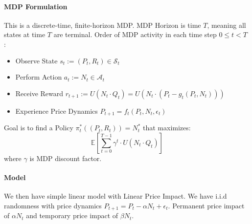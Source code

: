 \documentclass[11pt]{article}
\begin{document}
\paragraph*{MDP Formulation}
This is a discrete-time, finite-horizon MDP.
MDP Horizon is time $T$, meaning all states at time $T$ are terminal.
Order of MDP activity in each time step $0 \leq t<T$ :
\begin{itemize}
    \item Observe State $s_t:=\left(P_t, R_t\right) \in \mathcal{S}_t$
    \item Perform Action $a_t:=N_t \in \mathcal{A}_t$
    \item Receive Reward $r_{t+1}:=U\left(N_t \cdot Q_t\right)=U\left(N_t \cdot\left(P_t-g_t\left(P_t, N_t\right)\right)\right)$
    \item Experience Price Dynamics $P_{t+1}=f_t\left(P_t, N_t, \epsilon_t\right)$
\end{itemize}
Goal is to find a Policy $\pi_t^*\left(\left(P_t, R_t\right)\right)=N_t^*$ that maximizes:
$$
\mathbb{E}\left[\sum_{t=0}^{T-1} \gamma^t \cdot U\left(N_t \cdot Q_t\right)\right]
$$ where $\gamma$ is MDP discount factor.

\paragraph*{Model}
We then have simple linear model with Linear Price Impact. We have i.i.d randomness with price dynamics $P_{t+1} = P_t - \alpha N_t + \epsilon_t$. Permanent price impact of $\alpha N_t$ and temporary price impact of $\beta N_t$. 
\end{document}
